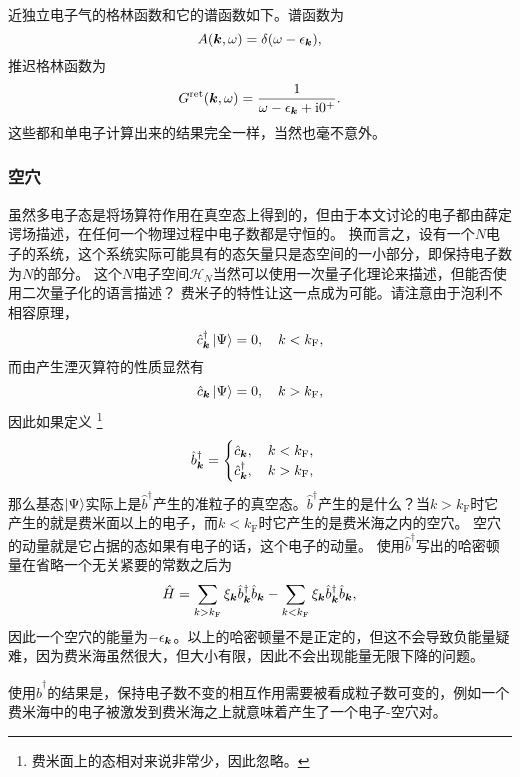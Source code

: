 \documentclass[hyperref, UTF8, a4paper]{ctexart}
\newcommand*{\ii}{\mathrm{i}}
\begin{document}
近独立电子气的格林函数和它的谱函数如下。谱函数为
\begin{equation}
    A(\vb*{k}, \omega) = \delta(\omega - \epsilon_{\vb*{k}}),
\end{equation}
推迟格林函数为
\begin{equation}
    G^\text{ret}(\vb*{k}, \omega) = \frac{1}{\omega - \epsilon_{\vb*{k}} + \ii 0^+}.
\end{equation}
这些都和单电子计算出来的结果完全一样，当然也毫不意外。

\subsubsection{空穴}

虽然多电子态是将场算符作用在真空态上得到的，但由于本文讨论的电子都由薛定谔场描述，在任何一个物理过程中电子数都是守恒的。
换而言之，设有一个$N$电子的系统，这个系统实际可能具有的态矢量只是态空间的一小部分，即保持电子数为$N$的部分。
这个$N$电子空间$\mathcal{H}_N$当然可以使用一次量子化理论来描述，但能否使用二次量子化的语言描述？
费米子的特性让这一点成为可能。请注意由于泡利不相容原理，
\[
    \hat{c}^\dagger_{\vb*{k}} \ket{\Psi} = 0, \quad k < k_\text{F},
\]
而由产生湮灭算符的性质显然有
\[
    \hat{c}_{\vb*{k}} \ket{\Psi} = 0, \quad k > k_\text{F},
\]
因此如果定义%
\footnote{费米面上的态相对来说非常少，因此忽略。}%
\begin{equation}
    \hat{b}^\dagger_{\vb*{k}} = \begin{cases}
        \hat{c}_{\vb*{k}}, \quad k < k_\text{F}, \\
        \hat{c}_{\vb*{k}}^\dagger, \quad k > k_\text{F},
    \end{cases}
\end{equation}
那么基态$\ket{\Psi}$实际上是$\hat{b}^\dagger$产生的准粒子的真空态。$\hat{b}^\dagger$产生的是什么？当$k>k_\text{F}$时它产生的就是费米面以上的电子，而$k<k_\text{F}$时它产生的是费米海之内的空穴。
空穴的动量就是它占据的态如果有电子的话，这个电子的动量。
使用$\hat{b}^\dagger$写出的哈密顿量在省略一个无关紧要的常数之后为
\[
    \hat{H} = \sum_{k > k_\text{F}} \xi_{\vb*{k}} \hat{b}^\dagger_{\vb*{k}} \hat{b}_{\vb*{k}} - \sum_{k < k_\text{F}} \xi_{\vb*{k}} \hat{b}^\dagger_{\vb*{k}} \hat{b}_{\vb*{k}},
\]
因此一个空穴的能量为$-\epsilon_{\vb*{k}}$。以上的哈密顿量不是正定的，但这不会导致负能量疑难，因为费米海虽然很大，但大小有限，因此不会出现能量无限下降的问题。

使用$\hat{b}^\dagger$的结果是，保持电子数不变的相互作用需要被看成粒子数可变的，例如一个费米海中的电子被激发到费米海之上就意味着产生了一个电子-空穴对。
\end{document}
